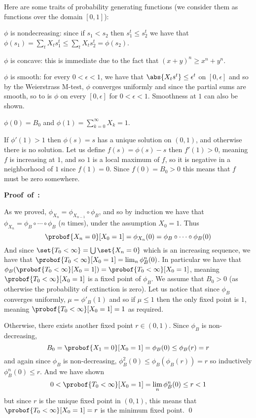 Here are some traits of probability generating functions (we consider them as functions over the domain $[0,1]$):
\benum
    \item $\phi$ is nondecreasing: since if $s_1<s_2$ then $s_1^t\leq s_2^t$ we have that $\phi(s_1)=\sum_t X_ts_1^t\leq\sum_t X_ts_2^t=\phi(s_2)$.
    \item $\phi$ is concave: this is immediate due to the fact that $(x+y)^n\geq x^n+y^n$.
    \item $\phi$ is smooth: for every $0<\epsilon<1$, we have that $\abs{X_ts^t}\leq\epsilon^t$ on $[0,\epsilon]$ and so by the Weierstrass M-test, $\phi$ converges uniformly and since the partial
        sums are smooth, so to is $\phi$ on every $[0,\epsilon]$ for $0<\epsilon<1$.
        Smoothness at $1$ can also be shown.
    \item $\phi(0)=B_0$ and $\phi(1)=\sum_{k=0}^\infty X_k=1$.
    \item If $\phi'(1)>1$ then $\phi(s)=s$ has a unique solution on $(0,1)$, and otherwise there is no solution.
        Let us define $f(s)=\phi(s)-s$ then $f'(1)>0$, meaning $f$ is increasing at $1$, and so $1$ is a local maximum of $f$, so it is negative in a neighborhood of $1$ since $f(1)=0$.
        Since $f(0)=B_0>0$ this means that $f$ must be zero somewhere.
\eenum

\hbox{\bf Proof of :}

As we proved, $\phi_{X_n}=\phi_{X_{n-1}}\circ\phi_B$, and so by induction we have that $\phi_{X_n}=\phi_B\circ\cdots\circ\phi_B$ ($n$ times), under the assumption $X_0=1$.
Thus
$$ \probof{X_n=0}[X_0=1] = \phi_{X_n}(0) = \phi_B\circ\cdots\circ\phi_B(0) $$
And since $\set{T_0<\infty}=\bigcup\set{X_n=0}$ which is an increasing sequence, we have that $\probof{T_0<\infty}[X_0=1]=\lim_n\phi_B^n(0)$.
In particular we have that $\phi_B(\probof{T_0<\infty}[X_0=1])=\probof{T_0<\infty}[X_0=1]$, meaning $\probof{T_0<\infty}[X_0=1]$ is a fixed point of $\phi_B$.
We assume that $B_0>0$ (as otherwise the probability of extinction is zero).
Let us notice that since $\phi_B$ converges uniformly, $\mu=\phi'_B(1)$ and so if $\mu\leq1$ then the only fixed point is $1$, meaning $\probof{T_0<\infty}[X_0=1]=1$ as required.

Otherwise, there exists another fixed point $r\in(0,1)$.
Since $\phi_B$ is non-decreasing,
$$ B_0 = \probof{X_1=0}[X_0=1] = \phi_B(0) \leq \phi_B(r) = r $$
and again since $\phi_B$ is non-decreasing, $\phi_B^2(0)\leq\phi_B(\phi_B(r))=r$ so inductively $\phi_B^n(0)\leq r$.
And we have shown
$$ 0 < \probof{T_0<\infty}[X_0=1] = \lim_n\phi_B^n(0) \leq r < 1 $$
but since $r$ is the unique fixed point in $(0,1)$, this means that $\probof{T_0<\infty}[X_0=1]=r$ is the minimum fixed point.
\qed

